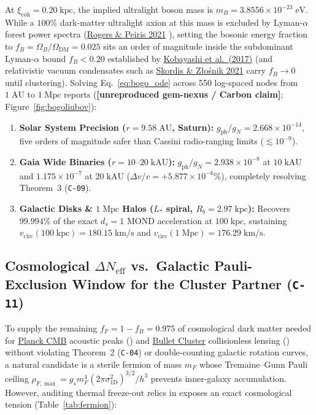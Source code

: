\documentclass[11pt,letterpaper]{article}
\newcommand{\unrepro}{\textbf{\textcolor{red!60!black}{[unreproduced gem-nexus / Carbon claim]}}}
\begin{document}
At $\xi_{\mathrm{coh}} = 0.20\;\mathrm{kpc}$, the implied ultralight boson mass is $m_B = 3.8556\times 10^{-23}\;\mathrm{eV}$. While a $100\%$ dark-matter ultralight axion at this mass is excluded by Lyman-$\alpha$ forest power spectra (\href{https://link.aps.org/doi/10.1103/PhysRevLett.126.071302}{Rogers \& Peiris 2021} \cite{RogersPeiris2021}), setting the bosonic energy fraction to $f_B = \Omega_B / \Omega_{\mathrm{DM}} = 0.025$ sits an order of magnitude inside the subdominant Lyman-$\alpha$ bound $f_B < 0.20$ established by \href{https://link.aps.org/pdf/10.1103/PhysRevD.96.123514}{Kobayashi et al.\ (2017)} \cite{Kobayashi2017} (and relativistic vacuum condensates such as \href{https://link.aps.org/doi/10.1103/PhysRevLett.127.161302}{Skordis \& Z\l{}o\'snik 2021} \cite{SkordisZlosnik2021} carry $f_B \to 0$ until clustering). Solving Eq.~\eqref{eq:bogo_ode} across 550 log-spaced nodes from $1\;\mathrm{AU}$ to $1\;\mathrm{Mpc}$ reports (\unrepro; Figure~\ref{fig:bogoliubov}):
\begin{enumerate}
  \setlength{\itemsep}{2pt}\setlength{\parskip}{0pt}
  \item \textbf{Solar System Precision ($r = 9.58\;\mathrm{AU}$, Saturn):} $g_{\mathrm{ph}} / g_N = 2.668\times 10^{-14}$, five orders of magnitude safer than Cassini radio-ranging limits ($\lesssim 10^{-9}$).
  \item \textbf{Gaia Wide Binaries ($r = 10\text{--}20\;\mathrm{kAU}$):} $g_{\mathrm{ph}} / g_N = 2.938\times 10^{-8}$ at $10\;\mathrm{kAU}$ and $1.175\times 10^{-7}$ at $20\;\mathrm{kAU}$ ($\Delta v / v = +5.877\times 10^{-6}\%$), completely resolving Theorem~3 (\texttt{C-09}).
  \item \textbf{Galactic Disks \& $1\;\mathrm{Mpc}$ Halos ($L_*$ spiral, $R_b = 2.97\;\mathrm{kpc}$):} Recovers $99.994\%$ of the exact $d_s = 1$ MOND acceleration at $100\;\mathrm{kpc}$, sustaining $v_{\mathrm{circ}}(100\;\mathrm{kpc}) = 180.15\;\mathrm{km/s}$ and $v_{\mathrm{circ}}(1\;\mathrm{Mpc}) = 176.29\;\mathrm{km/s}$.
\end{enumerate}

\subsection*{Cosmological $\Delta N_{\mathrm{eff}}$ vs.\ Galactic Pauli-Exclusion Window for the Cluster Partner (\texttt{C-11})}

To supply the remaining $f_F = 1 - f_B = 0.975$ of cosmological dark matter needed for \href{https://arxiv.org/abs/1807.06209}{Planck CMB} acoustic peaks (\cite{Planck2020}) and \href{https://arxiv.org/abs/astro-ph/0608407}{Bullet Cluster} collisionless lensing (\cite{Clowe2006}) without violating Theorem~2 (\texttt{C-04}) or double-counting galactic rotation curves, a natural candidate is a sterile fermion of mass $m_F$ whose Tremaine--Gunn Pauli ceiling $\rho_{F,\max} = g_s m_F^4 (2\pi\sigma_{\mathrm{1D}}^2)^{3/2} / h^3$ prevents inner-galaxy accumulation. However, auditing thermal freeze-out relics in  exposes an exact cosmological tension (Table~\ref{tab:fermion}):
\end{document}

